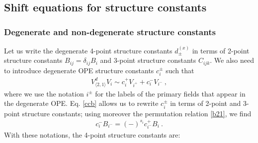 \documentclass[12pt, a4paper]{article}
\theoremstyle{break}
\begin{document}
\subsection{Shift equations for structure constants}

\subsubsection{Degenerate and non-degenerate structure constants}

Let us write the degenerate 4-point structure constants $d^{(x)}_\pm$ in terms of 2-point structure constants $B_{ij}=\delta_{ij}B_i$ and 3-point structure constants $C_{ijk}$. We also need to introduce degenerate OPE structure constants $c_i^\pm$ such that 
\begin{align}
V_{\langle 2,1\rangle}^d V_i \sim c^+_i V_{i^+} + c^-_i V_{i^-}\ ,
\end{align}
where we use the notation $i^\pm$ for the labels of the primary fields that appear in the degenerate OPE. Eq. \eqref{ccb} allows us to rewrite $c_i^\pm$ in terms of 2-point and 3-point structure constants; using moreover the permutation relation \eqref{b21}, we find 
\begin{align}
 c_i^- B_{i^-} = (-)^{s_i} c^+_{i^-} B_i\ .
 \label{cbcb}
\end{align}
With these notations, the 4-point structure constants are:
\end{document}
